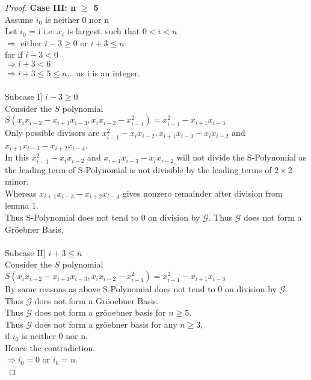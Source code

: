 \documentclass[12pt,a4paper]{article}
\theoremstyle{definition}
\begin{document}
\begin{proof}


{\noindent \bf Case III: n $\geq$ 5} 
\\Assume $i_{0}$ is neither 0 nor n \\
Let $i_{0}$ = i i.e. $x_{i}$ is largest.
such that $0 < i < n$\\
$\Rightarrow$ either $i-3 \geq 0 $ or $ i + 3 \leq n$ \\
for if $i-3 < 0 $
\\
$\Rightarrow i+3 < 6$\\
$\Rightarrow i+3 \leq 5 \leq n \ldots $ as i is an  
integer.
\\
\\
Subcase I] $i - 3 \geq 0$
\\
Consider the $S$ polynomial \\
$S(x_{i}x_{i-2} - x_{i+1}x_{i-3} , x_{i}x_{i-2} - x_{i-1}^2) = x_{i-1}^2 - x_{i+1}x_{i-3}$
\\
Only possible divisors are $x_{i-1}^2-x_{i}x_{i-2}, x_{i+1}x_{i-3}-x_{i}x_{i-2}$ and $x_{i+1}x_{i-3}-x_{i+2}x_{i-4}$.\\
In this $x_{i-1}^2-x_{i}x_{i-2}$ and $x_{i+1}x_{i-3}-x_{i}x_{i-2}$ will not divide the S-Polynomial as the leading term of S-Polynomial is not divisible by the leading terms of $2\times 2$ minor.\\
Whereas $x_{i+1}x_{i-3}-x_{i+2}x_{i-4}$ gives nonzero remainder after division from lemma 1.
\\
Thus S-Polynomial does not tend to 0 on division by $\mathcal{G}$. Thus $\mathcal{G}$ does not form a Gr\"{o}ebner Basis.
\\
\\
Subcase II] $i + 3 \leq n$
\\
Consider the $S$ polynomial\\
$S(x_{i}x_{i-2} - x_{i+1}x_{i-3} , x_{i}x_{i-2} - x_{i-1}^2) = x_{i-1}^2 - x_{i+1}x_{i-3}$
\\
By same reasons as above S-Polynomial 
does not tend to 0 on division by $\mathcal{G}$. Thus $\mathcal{G}$ does not form a Gr\"{o}oebner Basis.
\\
Thus $\mathcal{G}$ does not form a gr\"{o}oebner basis for $n \geq 5$.\\
Thus $\mathcal{G}$ does not form a gr\"{o}ebner basis for any $n \geq 3$,\\
if $i_{0}$ is neither 0 nor n.\\
Hence the contradiction.\\
$\Rightarrow i_{0} = 0$ or $i_{0} = n$.\\
\end{proof}
\end{document}

